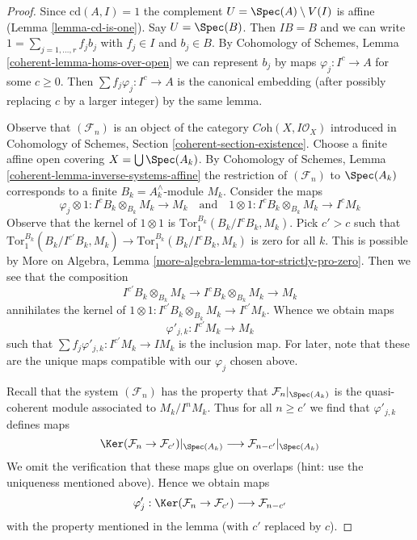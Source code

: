 \begin{proof}
Since $\text{cd}(A, I) = 1$ the complement $U = \Spec(A) \setminus V(I)$
is affine (Lemma \ref{lemma-cd-is-one}). Say $U = \Spec(B)$. Then $IB = B$
and we can write $1 = \sum_{j = 1, \ldots, r} f_j b_j$ with $f_j \in I$
and $b_j \in B$. By
Cohomology of Schemes, Lemma \ref{coherent-lemma-homs-over-open}
we can represent $b_j$ by maps $\varphi_j : I^c \to A$
for some $c \geq 0$. Then $\sum f_j \varphi_j : I^c \to A$
is the canonical embedding (after possibly replacing $c$ by a larger
integer) by the same lemma.

\medskip\noindent
Observe that $(\mathcal{F}_n)$ is an object of the category
$\textit{Coh}(X, I\mathcal{O}_X)$ introduced
in Cohomology of Schemes, Section \ref{coherent-section-existence}.
Choose a finite affine open covering $X = \bigcup \Spec(A_k)$.
By Cohomology of Schemes, Lemma \ref{coherent-lemma-inverse-systems-affine}
the restriction of $(\mathcal{F}_n)$ to $\Spec(A_k)$
corresponds to a finite $B_k = A_k^\wedge$-module $M_k$.
Consider the maps
$$
\varphi_j \otimes 1 : I^cB_k \otimes_{B_k} M_k \to M_k
\quad\text{and}\quad
1 \otimes 1 : I^cB_k \otimes_{B_k} M_k \to I^cM_k
$$
Observe that the kernel of $1 \otimes 1$ is
$\text{Tor}_1^{B_k}(B_k/I^cB_k, M_k)$.
Pick $c' > c$ such that
$\text{Tor}_1^{B_k}(B_k/I^{c'}B_k, M_k) \to 
\text{Tor}_1^{B_k}(B_k/I^cB_k, M_k)$ is zero for all $k$.
This is possible by More on Algebra, Lemma
\ref{more-algebra-lemma-tor-strictly-pro-zero}.
Then we see that the composition
$$
I^{c'}B_k \otimes_{B_k} M_k \to
I^cB_k \otimes_{B_k} M_k \to M_k
$$
annihilates the kernel of
$1 \otimes 1 : I^{c'}B_k \otimes_{B_k} M_k \to I^{c'}M_k$.
Whence we obtain maps
$$
\varphi'_{j, k} : I^{c'}M_k \longrightarrow M_k
$$
such that $\sum f_j \varphi'_{j, k} : I^{c'}M_k \to IM_k$
is the inclusion map. For later, note that these are the
unique maps compatible with our $\varphi_j$ chosen above.

\medskip\noindent
Recall that the system $(\mathcal{F}_n)$ has the property
that $\mathcal{F}_n|_{\Spec(A_k)}$ is the quasi-coherent module
associated to $M_k/I^nM_k$. Thus for all $n \geq c'$ we find
that $\varphi'_{j, k}$ defines maps
$$
\Ker(\mathcal{F}_n \to \mathcal{F}_{c'})|_{\Spec(A_k)}
\longrightarrow
\mathcal{F}_{n - c'}|_{\Spec(A_k)}
$$
We omit the verification that these maps glue on overlaps
(hint: use the uniqueness mentioned above). Hence we obtain maps
$$
\varphi'_j :
\Ker(\mathcal{F}_n \to \mathcal{F}_{c'})
\longrightarrow
\mathcal{F}_{n - c'}
$$
with the property mentioned in the lemma (with $c'$ replaced by $c$).
\end{proof}

